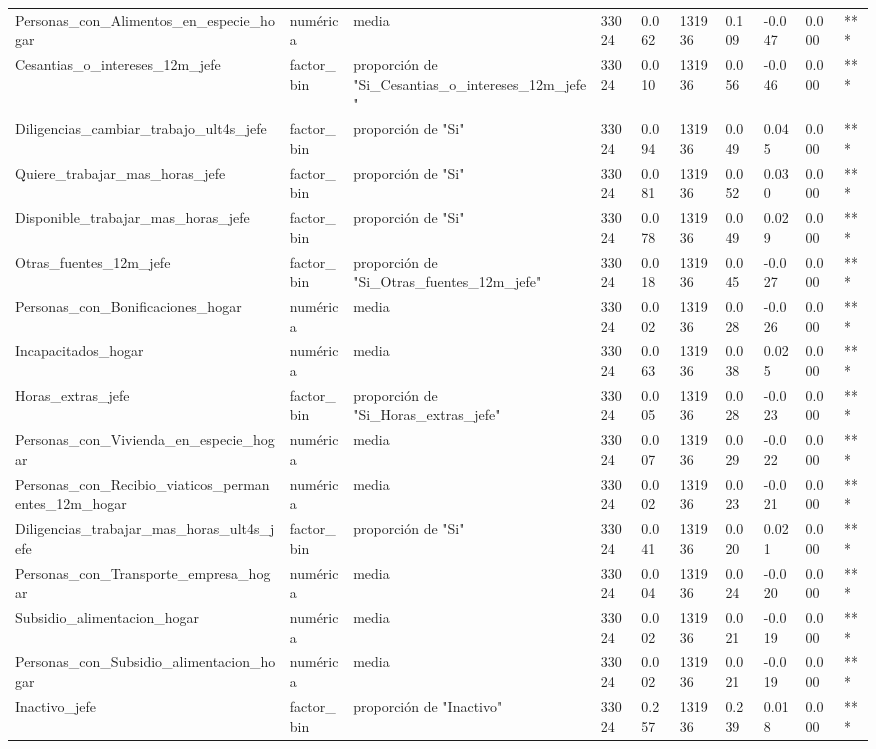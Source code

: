 \begin{longtable}[t]{llllllllll}
Personas\_con\_Alimentos\_en\_especie\_hogar & numérica & media & 33024 & 0.062 & 131936 & 0.109 & -0.047 & 0.000 & ***\\
Cesantias\_o\_intereses\_12m\_jefe & factor\_bin & proporción de "Si\_Cesantias\_o\_intereses\_12m\_jefe" & 33024 & 0.010 & 131936 & 0.056 & -0.046 & 0.000 & ***\\
Diligencias\_cambiar\_trabajo\_ult4s\_jefe & factor\_bin & proporción de "Si" & 33024 & 0.094 & 131936 & 0.049 & 0.045 & 0.000 & ***\\
Quiere\_trabajar\_mas\_horas\_jefe & factor\_bin & proporción de "Si" & 33024 & 0.081 & 131936 & 0.052 & 0.030 & 0.000 & ***\\
Disponible\_trabajar\_mas\_horas\_jefe & factor\_bin & proporción de "Si" & 33024 & 0.078 & 131936 & 0.049 & 0.029 & 0.000 & ***\\
Otras\_fuentes\_12m\_jefe & factor\_bin & proporción de "Si\_Otras\_fuentes\_12m\_jefe" & 33024 & 0.018 & 131936 & 0.045 & -0.027 & 0.000 & ***\\
Personas\_con\_Bonificaciones\_hogar & numérica & media & 33024 & 0.002 & 131936 & 0.028 & -0.026 & 0.000 & ***\\
Incapacitados\_hogar & numérica & media & 33024 & 0.063 & 131936 & 0.038 & 0.025 & 0.000 & ***\\
Horas\_extras\_jefe & factor\_bin & proporción de "Si\_Horas\_extras\_jefe" & 33024 & 0.005 & 131936 & 0.028 & -0.023 & 0.000 & ***\\
Personas\_con\_Vivienda\_en\_especie\_hogar & numérica & media & 33024 & 0.007 & 131936 & 0.029 & -0.022 & 0.000 & ***\\
Personas\_con\_Recibio\_viaticos\_permanentes\_12m\_hogar & numérica & media & 33024 & 0.002 & 131936 & 0.023 & -0.021 & 0.000 & ***\\
Diligencias\_trabajar\_mas\_horas\_ult4s\_jefe & factor\_bin & proporción de "Si" & 33024 & 0.041 & 131936 & 0.020 & 0.021 & 0.000 & ***\\
Personas\_con\_Transporte\_empresa\_hogar & numérica & media & 33024 & 0.004 & 131936 & 0.024 & -0.020 & 0.000 & ***\\
Subsidio\_alimentacion\_hogar & numérica & media & 33024 & 0.002 & 131936 & 0.021 & -0.019 & 0.000 & ***\\
Personas\_con\_Subsidio\_alimentacion\_hogar & numérica & media & 33024 & 0.002 & 131936 & 0.021 & -0.019 & 0.000 & ***\\
Inactivo\_jefe & factor\_bin & proporción de "Inactivo" & 33024 & 0.257 & 131936 & 0.239 & 0.018 & 0.000 & ***\\

\end{longtable}
